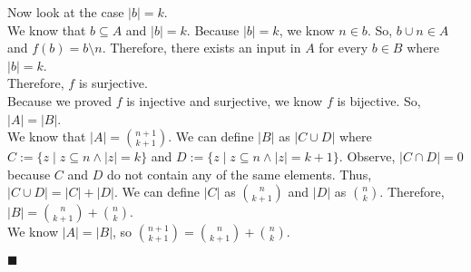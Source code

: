 \documentclass[11pt,a4paper]{article}
\begin{document}
\begin{enumerate}
\begin{enumerate}
        Now look at the case $|b| = k $. \\
        We know that $b \subseteq A  $ and $|b| = k $. Because $|b| = k $, we know $n \in b$. So, $b \cup n \in A $ and $f(b) = b \setminus n $. Therefore, there exists an input in $A$ for every $b \in B$ where $|b| = k $. \\
        Therefore, $f$ is surjective. \\
        Because we proved $f$ is injective and surjective, we know $f$ is bijective. So, $|A| = |B| $. \\
        We know that $|A| = \binom{n + 1}{k + 1} $. We can define $|B|$ as $|C \cup D |$ where $C := \{z \mid z \subseteq n \land |z| = k \} $ and $D := \{z \mid z \subseteq n \land |z| = k + 1 \} $. Observe, $|C \cap D| = 0 $ because $C$ and $D$ do not contain any of the same elements.
        Thus, $|C \cup D| = |C| + |D| $. We can define $|C|$ as $\binom{n}{k + 1} $ and $|D|$ as $\binom{n}{k} $. Therefore, $|B| = \binom{n}{k + 1} + \binom{n}{k} $. \\
        We know $|A| = |B| $, so $\binom{n + 1}{k + 1} = \binom{n}{k + 1} + \binom{n}{k} $.      
        \begin{flushright}
            $\blacksquare$
        \end{flushright} 

    \end{enumerate}


\end{enumerate}
\end{document}
